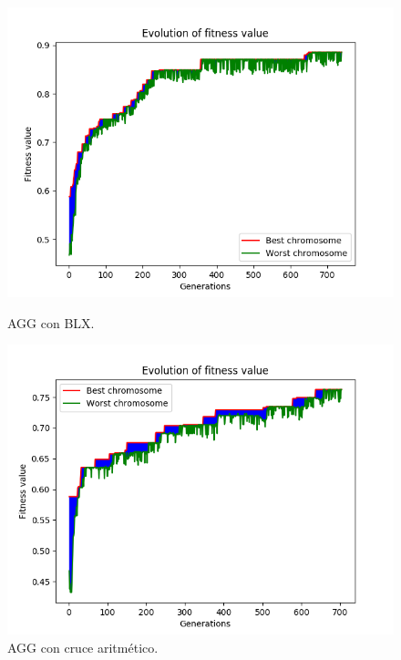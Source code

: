 \documentclass[11pt,a4paper]{article}
\begin{document}
\begin{figure}[H]
\centering
\begin{minipage}{.5\textwidth}
	\centering
	\includegraphics[scale=0.43]{img/agg-blx-ionosphere.png}
	\caption{AGG con BLX.}
\end{minipage}%
\begin{minipage}{.5\textwidth}
	\centering
	\includegraphics[scale=0.43]{img/agg-ac-ionosphere.png}
	\caption{AGG con cruce aritmético.}
\end{minipage}
\end{figure}
\end{document}

